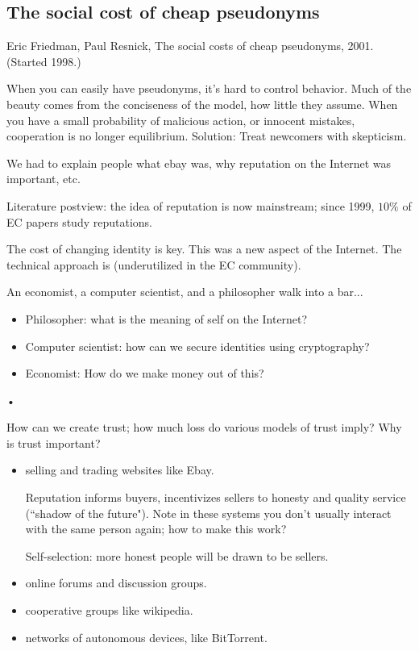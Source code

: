 \subsection{The social cost of cheap pseudonyms}

Eric Friedman, Paul Resnick, The social costs of cheap pseudonyms, 2001. (Started 1998.)

When you can easily have pseudonyms, it's hard to control behavior. Much of the beauty comes from the conciseness of the model, how little they assume. %
When you have a small probability of malicious action, or innocent mistakes, cooperation is no longer equilibrium. Solution: Treat newcomers with skepticism.



We had to explain people what ebay was, why reputation on the Internet was important, etc.

Literature postview: the idea of reputation is now mainstream; since 1999, $10\%$ of EC papers study reputations.


The cost of changing identity is key. This was a new aspect of the Internet. 
The technical approach is  (underutilized in the EC community). 

An economist, a computer scientist, and a philosopher walk into a bar...
\begin{itemize}
\item
Philosopher: what is the meaning of self on the Internet?
\item
Computer scientist: how can we secure identities using cryptography?
\item
Economist: How do we make money out of this?
\end{itemize}•

How can we create trust; how much loss do various models of trust imply? Why is trust important?
\begin{itemize}
\item
selling and trading websites like Ebay.

Reputation informs buyers, incentivizes sellers to honesty and quality service (``shadow of the future"). Note in these systems you don't usually interact with the same person again; how to make this work?

Self-selection: more honest people will be drawn to be sellers.
\item
online forums and discussion groups.
\item
cooperative groups like wikipedia.
\item networks of autonomous devices, like BitTorrent.
\end{itemize}


